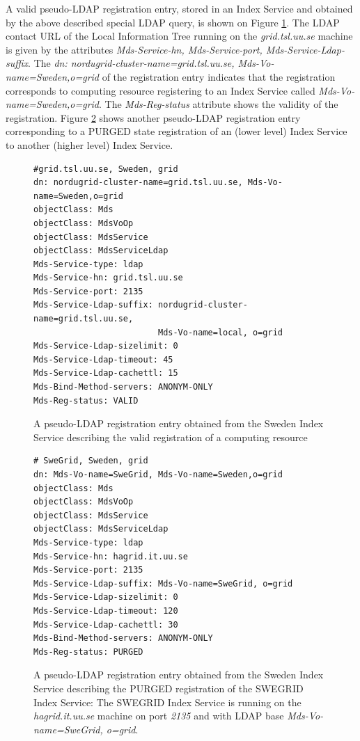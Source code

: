 \documentclass{article}
\begin{document}
A valid pseudo-LDAP registration entry, stored in an Index Service and obtained 
by the above described special LDAP query, 
is shown on Figure \ref{fig:regentry1}. The LDAP contact URL of the
Local Information Tree running on the {\it grid.tsl.uu.se} machine  is given by the 
attributes {\it Mds-Service-hn, Mds-Service-port, Mds-Service-Ldap-suffix}.
The {\it dn: nordugrid-cluster-name=grid.tsl.uu.se, Mds-Vo-name=Sweden,o=grid} 
of the registration entry indicates that the registration corresponds to 
computing resource registering to an Index Service called 
{\it  Mds-Vo-name=Sweden,o=grid}.
The {\it Mds-Reg-status} attribute shows the validity of the registration.
Figure \ref{fig:regentry2} shows another pseudo-LDAP registration entry 
corresponding to a PURGED state registration of an (lower level) Index Service 
to another (higher level) Index Service.


\begin{figure}
\begin{verbatim}
#grid.tsl.uu.se, Sweden, grid
dn: nordugrid-cluster-name=grid.tsl.uu.se, Mds-Vo-name=Sweden,o=grid
objectClass: Mds
objectClass: MdsVoOp
objectClass: MdsService
objectClass: MdsServiceLdap
Mds-Service-type: ldap
Mds-Service-hn: grid.tsl.uu.se
Mds-Service-port: 2135
Mds-Service-Ldap-suffix: nordugrid-cluster-name=grid.tsl.uu.se, 
                         Mds-Vo-name=local, o=grid
Mds-Service-Ldap-sizelimit: 0
Mds-Service-Ldap-timeout: 45
Mds-Service-Ldap-cachettl: 15
Mds-Bind-Method-servers: ANONYM-ONLY
Mds-Reg-status: VALID
\end{verbatim}
\caption{\label{fig:regentry1} A pseudo-LDAP registration entry obtained from the Sweden Index Service 
describing the valid registration of a computing resource}
\end{figure}


\begin{figure}
\begin{verbatim}
# SweGrid, Sweden, grid
dn: Mds-Vo-name=SweGrid, Mds-Vo-name=Sweden,o=grid
objectClass: Mds
objectClass: MdsVoOp
objectClass: MdsService
objectClass: MdsServiceLdap
Mds-Service-type: ldap
Mds-Service-hn: hagrid.it.uu.se
Mds-Service-port: 2135
Mds-Service-Ldap-suffix: Mds-Vo-name=SweGrid, o=grid
Mds-Service-Ldap-sizelimit: 0
Mds-Service-Ldap-timeout: 120
Mds-Service-Ldap-cachettl: 30
Mds-Bind-Method-servers: ANONYM-ONLY
Mds-Reg-status: PURGED
\end{verbatim}
\caption{\label{fig:regentry2} A pseudo-LDAP registration entry obtained 
from the Sweden Index Service 
describing the PURGED registration of the SWEGRID Index Service:
The SWEGRID Index Service is running on the {\it hagrid.it.uu.se} machine on port
{\it 2135} and with LDAP base {\it Mds-Vo-name=SweGrid, o=grid}.}
\end{figure}
\end{document}
